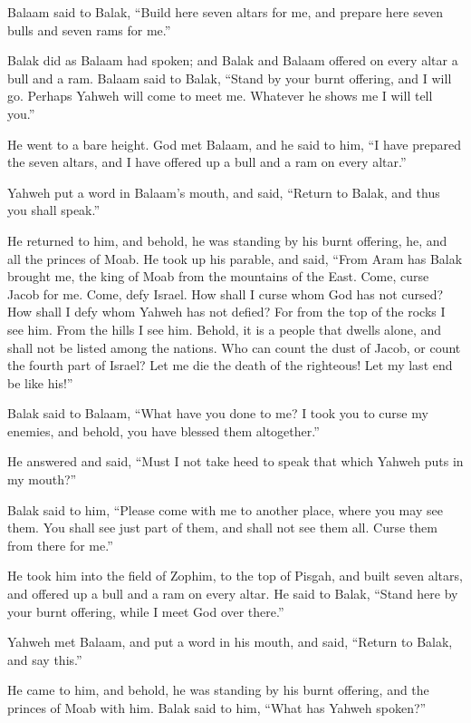  Balaam said to Balak, ``Build here seven altars for me, and
prepare here seven bulls and seven rams for me.''

 Balak did as Balaam had spoken; and Balak and Balaam
offered on every altar a bull and a ram.  Balaam said to
Balak, ``Stand by your burnt offering, and I will go. Perhaps Yahweh
will come to meet me. Whatever he shows me I will tell you.''

He went to a bare height.  God met Balaam, and he said to
him, ``I have prepared the seven altars, and I have offered up a bull
and a ram on every altar.''

 Yahweh put a word in Balaam's mouth, and said, ``Return to
Balak, and thus you shall speak.''

 He returned to him, and behold, he was standing by his
burnt offering, he, and all the princes of Moab.  He took up
his parable, and said, ``From Aram has Balak brought me, the king of
Moab from the mountains of the East. Come, curse Jacob for me. Come,
defy Israel.  How shall I curse whom God has not cursed? How
shall I defy whom Yahweh has not defied?  For from the top
of the rocks I see him. From the hills I see him. Behold, it is a people
that dwells alone, and shall not be listed among the nations.
 Who can count the dust of Jacob, or count the fourth part
of Israel? Let me die the death of the righteous! Let my last end be
like his!''

 Balak said to Balaam, ``What have you done to me? I took
you to curse my enemies, and behold, you have blessed them altogether.''

 He answered and said, ``Must I not take heed to speak that
which Yahweh puts in my mouth?''

 Balak said to him, ``Please come with me to another place,
where you may see them. You shall see just part of them, and shall not
see them all. Curse them from there for me.''

 He took him into the field of Zophim, to the top of
Pisgah, and built seven altars, and offered up a bull and a ram on every
altar.  He said to Balak, ``Stand here by your burnt
offering, while I meet God over there.''

 Yahweh met Balaam, and put a word in his mouth, and said,
``Return to Balak, and say this.''

 He came to him, and behold, he was standing by his burnt
offering, and the princes of Moab with him. Balak said to him, ``What
has Yahweh spoken?''

